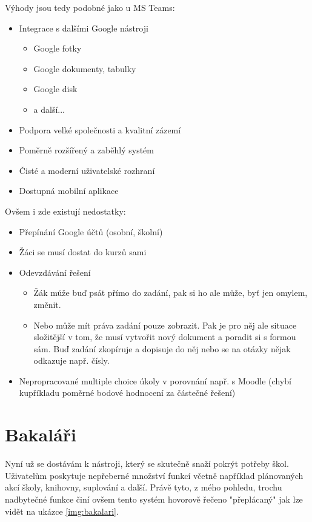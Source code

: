 Výhody jsou tedy podobné jako u MS Teams:
\begin{itemize}
  \item Integrace s dalšími Google nástroji
  \begin{itemize}
    \item Google fotky
    \item Google dokumenty, tabulky
    \item Google disk
    \item a další...
  \end{itemize}
  \item Podpora velké společnosti a kvalitní zázemí
  \item Poměrně rozšířený a zaběhlý systém
  \item Čisté a moderní uživatelské rozhraní
  \item Dostupná mobilní aplikace
\end{itemize}

Ovšem i zde existují nedostatky:
\begin{itemize}
  \item Přepínání Google účtů (osobní, školní)
  \item Žáci se musí dostat do kurzů sami
  \item Odevzdávání řešení
  \begin{itemize}
    \item Žák může buď psát přímo do zadání, pak si ho ale může, byť jen omylem, změnit.
    \item Nebo může mít práva zadání pouze zobrazit. Pak je pro něj ale situace složitější v tom, že musí vytvořit nový dokument a poradit si s formou sám. Buď zadání zkopíruje a dopisuje do něj nebo se na otázky nějak odkazuje např. čísly.
  \end{itemize}
  \item Nepropracované multiple choice úkoly v porovnání např. s Moodle (chybí kupříkladu poměrné bodové hodnocení za částečné řešení)
\end{itemize}

\section{Bakaláři}

Nyní už se dostávám k nástroji, který se skutečně snaží pokrýt potřeby škol. Uživatelům poskytuje nepřeberné množství funkcí včetně například plánovaných akcí školy, knihovny, suplování a další. Právě tyto, z mého pohledu, trochu nadbytečné funkce činí ovšem tento systém hovorově řečeno "přeplácaný" jak lze vidět na ukázce \ref{img:bakalari}.

